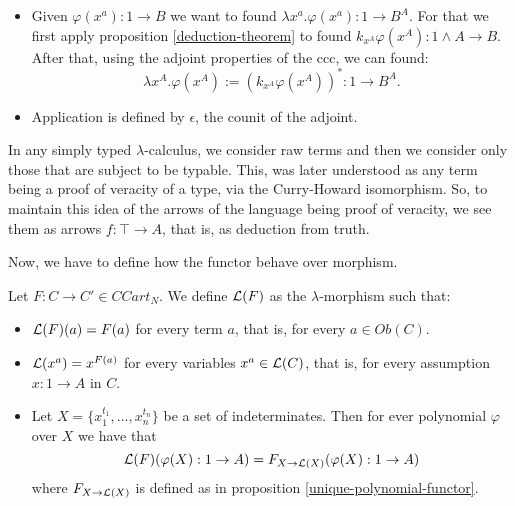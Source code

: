 \begin{definition}
\begin{itemize}
\begin{itemize}
    \item Given $\varphi(x^a):1 \to B$ we want to found $\lambda x^a.\varphi(x^a): 1 \to B^A$.  For that we first apply proposition \ref{deduction-theorem} to found $k_{x^A}\varphi(x^A): 1 \land A \to B$. After that, using the adjoint properties of the ccc, we can found:
      $$\lambda x^A.\varphi(x^A) := \left( k_{x^A}\varphi(x^A)\right)^*: 1 \to B^A.$$
    \item Application is defined by $\epsilon$, the counit of the adjoint.
    \end{itemize}
  \end{itemize}

\end{definition}


\begin{remark}
  In any simply typed $\lambda$-calculus, we consider raw terms and then we consider only those that are subject to be typable. This, was later understood as any term being a proof of veracity of a type, via the Curry-Howard isomorphism. So, to maintain this idea of the arrows of the language being proof of veracity, we see them as arrows $f:\top \to A$, that is, as deduction from truth. \\
\end{remark}

Now, we have to define how the functor behave over morphism.

\begin{definition}
  Let $F:C\to C'\in CCart_N$. We define $\mathcal{L} (F)$ as the $\lambda$-morphism such that:
  \begin{itemize}
  \item $\mathcal{L} (F) (a)= F(a)$ for every term $a$, that is, for every $a\in Ob(C)$.
  \item $\mathcal{L} (x^a) = x^{F(a)}$ for every variables $x^a \in\mathcal{L}(C)$, that is, for every assumption $x: 1 \to A$ in $C$.
  \item Let $X= \{x_1^{t_1},...,x_n^{t_n}\}$ be a set of indeterminates. Then for ever polynomial $\varphi$ over $X$ we have that
    $$\mathcal{L}(F)(\varphi(X):1 \to A) = F_{X\to \mathcal{L}(X)}(\varphi(X):1 \to A)$$  where $F_{X\to \mathcal{L}(X)}$ is defined as in proposition \ref{unique-polynomial-functor}.
  \end{itemize}
\end{definition}

